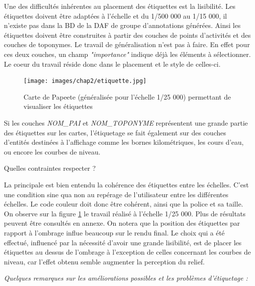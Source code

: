 Une des difficultés inhérentes au placement des étiquettes est la lisibilité. Les étiquettes doivent être adaptées à l'échelle et du 1/500 000 au 1/15 000, il n'existe pas dans la BD de la DAF de groupe d'annotations générées. Ainsi les étiquettes doivent être construites à partir des couches de points d'activités et des couches de toponymes. Le travail de généralisation n'est pas à faire. En effet pour ces deux couches, un champ \textit{"importance"} indique déjà les éléments à sélectionner. Le coeur du travail réside donc dans le placement et le style de celles-ci.

\begin{figure}[ht]
\centering
\texttt{[image: images/chap2/etiquette.jpg]}
\caption{Carte de Papeete (généralisée pour l'échelle 1/25 000) permettant de visualiser les étiquettes}
\label{25eti}
\end{figure}

Si les couches \textit{NOM\_PAI} et \textit{NOM\_TOPONYME} représentent une grande partie des étiquettes sur les cartes, l'étiquetage se fait également sur des couches d'entités destinées à l'affichage comme les bornes kilométriques, les cours d'eau, ou encore les courbes de niveau.

\begin{center}
    Quelles contraintes respecter ?
\end{center}

La principale est bien entendu la cohérence des étiquettes entre les échelles. C'est une condition sine qua non au repérage de l'utilisateur entre les différentes échelles. Le code couleur doit donc être cohérent, ainsi que la police et sa taille. On observe sur la figure \ref{25eti} le travail réalisé à l'échelle 1/25 000. Plus de résultats peuvent être consultés en annexe.
On notera que la position des étiquettes par rapport à l'ombrage influe beaucoup sur le rendu final. Le choix qui a été effectué, influencé par la nécessité d'avoir une grande lisibilité, est de placer les étiquettes au dessus de l'ombrage à l'exception de celles concernant les courbes de niveau, car l'effet obtenu semble augmenter la perception du relief.

\begin{center}
    \textit{Quelques remarques sur les améliorations possibles et les problèmes d'étiquetage :}
\end{center}

